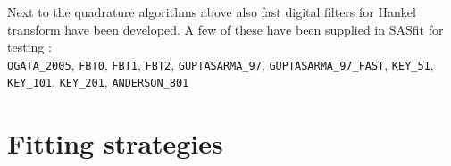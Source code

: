 Next to the quadrature algorithms above also fast digital filters for Hankel transform have been developed. A few of these have been supplied in SASfit for testing \cite{Anderson1989,Guptasarma1997,Ogata2005,Kong2007,Key2012,Kang2021}: \\
\texttt{OGATA\_2005}, \texttt{FBT0}, \texttt{FBT1}, \texttt{FBT2}, \texttt{GUPTASARMA\_97}, \texttt{GUPTASARMA\_97\_FAST}, \texttt{KEY\_51}, \texttt{KEY\_101}, \texttt{KEY\_201}, \texttt{ANDERSON\_801}



\clearpage
\section{Fitting strategies}
